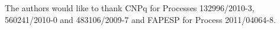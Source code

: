 The authors would like to thank CNPq for Processes 132996/2010-3, 560241/2010-0 and 483106/2009-7 and FAPESP for Process 2011/04064-8.